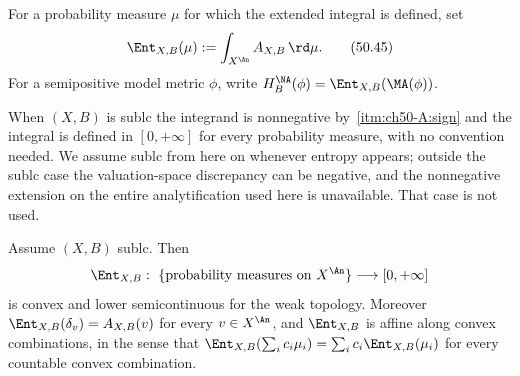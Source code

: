 \begin{definition}[Entropy]
\label{def:stability-entropy}
For a probability measure $\mu$ for which the extended integral is
defined, set
\[
                  \Ent_{X,B}(\mu)
                   :=\int_{X^{\An}}A_{X,B}\,\rd \mu.
\tag{50.45}\label{eq:stability-entropy}
\]
For a semipositive model metric $\phi$, write
$H^{\NA}_B(\phi)=\Ent_{X,B}(\MA(\phi))$.
\end{definition}

When $(X,B)$ is sublc the integrand is nonnegative by
\,\cref{itm:ch50-A:sign} and the integral is
defined in $[0,+\infty]$ for every probability measure, with no
convention needed.  We assume sublc from here on whenever entropy appears;
outside the sublc case the valuation-space discrepancy can be negative,
and the nonnegative extension on the entire analytification used here is
unavailable.  That case is not used.

\begin{theorem}
\label{thm:ch50-entropy-lsc}
Assume $(X,B)$ sublc.  Then
\[
 \Ent_{X,B}:\ \{\text{probability measures on }X^{\An}\}
 \longrightarrow[0,+\infty]
\]
is convex and lower semicontinuous for the weak topology.  Moreover
$\Ent_{X,B}(\delta_v)=A_{X,B}(v)$ for every $v\in X^{\An}$, and
$\Ent_{X,B}$ is affine along convex combinations, in the sense that
$\Ent_{X,B}(\sum_ic_i\mu_i)=\sum_ic_i\Ent_{X,B}(\mu_i)$ for every
countable convex combination.
\end{theorem}

